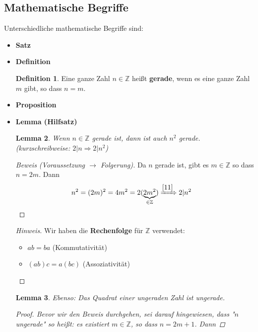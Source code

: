 \documentclass{article}
\theoremstyle{definition}
\newtheorem{definition}{Definition}[section]
\theoremstyle{plain}
\newtheorem{lem}[definition]{Lemma}
\begin{document}
\subsection{Mathematische Begriffe}
Unterschiedliche mathematische Begriffe sind:
\begin{itemize}
	\item \textbf{Satz}
	\item \textbf{Definition}
	\begin{tcolorbox}[colback={white}, colframe={DarkGreen},breakable]
		\begin{definition}\label{11}
			Eine ganze Zahl $ n \in \mathbb{Z} $ heißt \textbf{gerade}, wenn es eine ganze Zahl $ m $ gibt, so dass $ n=m $.
		\end{definition}
	\end{tcolorbox}
	\item \textbf{Proposition}
	\item \textbf{Lemma (Hilfsatz)}
	\begin{tcolorbox}[colback={white}, colframe={DarkGreen},breakable]
		\begin{lem}
			Wenn $ n \in \mathbb{Z} $ gerade ist, dann ist auch $ n^2 $ gerade. (kurzschreibweise: $ 2|n \Rightarrow 2|n^2 $)
		\end{lem}
		\begin{proof}[Beweis (Voraussetzung $\to$ Folgerung)]
			Da $ n $ gerade ist, gibt es $ m \in \mathbb{Z} $ so dass $ n = 2m $. Dann
			\begin{align*}
				n^2 & = (2m)^2 = 4m^2 = 2(\underbrace{2m^2}_{\in \mathbb{Z}}) \xRightarrow[]{\ref{11}} 2 | n^2
			\end{align*}
		\end{proof}
	\begin{proof}[Hinweis]\let\qed\relax
		Wir haben die \textbf{Rechenfolge} für $ \mathbb{Z} $ verwendet:
		\begin{itemize}
			\item $ ab = ba $ \hfill (Kommutativität)
			\item $ (ab)c = a(bc) $ \hfill (Assoziativität) 
		\end{itemize}
	\end{proof}
	\end{tcolorbox}
	\begin{tcolorbox}[colback={white}, colframe={DarkGreen},breakable]
		\begin{lem}
			Ebenso: Das Quadrat einer ungeraden Zahl ist ungerade.
			\begin{proof}
				Bevor wir den Beweis durchgehen, sei darauf hingewiesen, dass "$ n $ ungerade" so heißt: es existiert $ m \in \mathbb{Z} $, so dass $ n = 2m+1 $. Dann

\end{proof}
\end{lem}
\end{tcolorbox}
\end{itemize}
\end{document}
